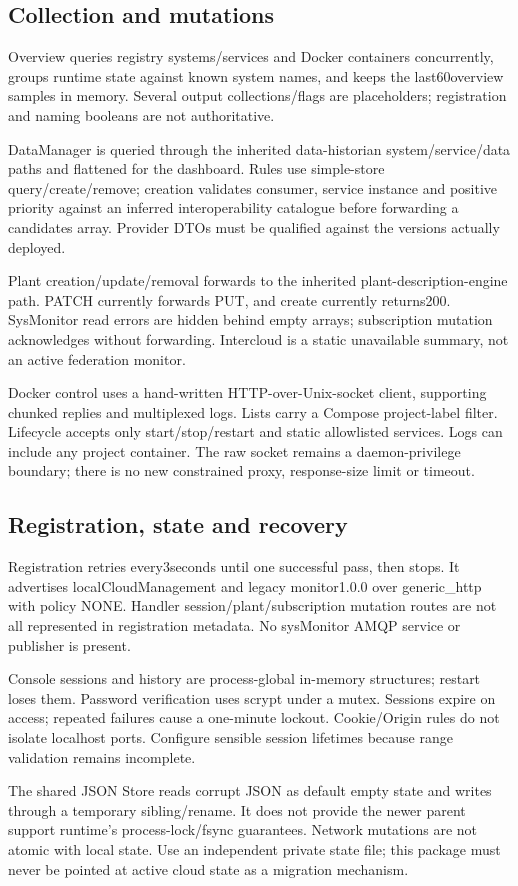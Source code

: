 \documentclass[a4paper]{arrowhead}
\begin{document}
\subsection{Collection and mutations}
\par
Overview queries registry systems/services and Docker containers concurrently, groups runtime state against known system names, and keeps the last60overview samples in memory. Several output collections/flags are placeholders; registration and naming booleans are not authoritative.
\par
DataManager is queried through the inherited data-historian system/service/data paths and flattened for the dashboard. Rules use simple-store query/create/remove; creation validates consumer, service instance and positive priority against an inferred interoperability catalogue before forwarding a candidates array. Provider DTOs must be qualified against the versions actually deployed.
\par
Plant creation/update/removal forwards to the inherited plant-description-engine path. PATCH currently forwards PUT, and create currently returns200. SysMonitor read errors are hidden behind empty arrays; subscription mutation acknowledges without forwarding. Intercloud is a static unavailable summary, not an active federation monitor.
\par
Docker control uses a hand-written HTTP-over-Unix-socket client, supporting chunked replies and multiplexed logs. Lists carry a Compose project-label filter. Lifecycle accepts only start/stop/restart and static allowlisted services. Logs can include any project container. The raw socket remains a daemon-privilege boundary; there is no new constrained proxy, response-size limit or timeout.
\par
\subsection{Registration, state and recovery}
\par
Registration retries every3seconds until one successful pass, then stops. It advertises localCloudManagement and legacy monitor1.0.0 over generic\_http with policy NONE. Handler session/plant/subscription mutation routes are not all represented in registration metadata. No sysMonitor AMQP service or publisher is present.
\par
Console sessions and history are process-global in-memory structures; restart loses them. Password verification uses scrypt under a mutex. Sessions expire on access; repeated failures cause a one-minute lockout. Cookie/Origin rules do not isolate localhost ports. Configure sensible session lifetimes because range validation remains incomplete.
\par
The shared JSON Store reads corrupt JSON as default empty state and writes through a temporary sibling/rename. It does not provide the newer parent support runtime's process-lock/fsync guarantees. Network mutations are not atomic with local state. Use an independent private state file; this package must never be pointed at active cloud state as a migration mechanism.
\par
\end{document}
